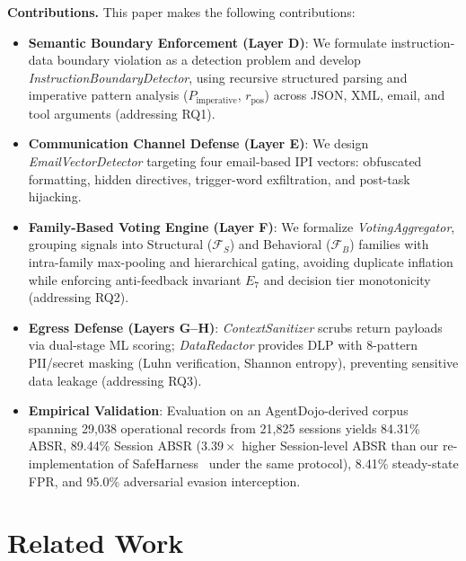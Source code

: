 \documentclass[runningheads]{llncs}
\begin{document}
\noindent\textbf{Contributions.} This paper makes the following contributions:
\begin{itemize}[leftmargin=*]
    \item \textbf{Semantic Boundary Enforcement (Layer D)}: We formulate instruction-data boundary violation as a detection problem and develop \textit{InstructionBoundaryDetector}, using recursive structured parsing and imperative pattern analysis ($P_{\text{imperative}}$, $r_{\text{pos}}$) across JSON, XML, email, and tool arguments (addressing RQ1).
    \item \textbf{Communication Channel Defense (Layer E)}: We design \textit{EmailVectorDetector} targeting four email-based IPI vectors: obfuscated formatting, hidden directives, trigger-word exfiltration, and post-task hijacking.
    \item \textbf{Family-Based Voting Engine (Layer F)}: We formalize \textit{VotingAggregator}, grouping signals into Structural ($\mathcal{F}_S$) and Behavioral ($\mathcal{F}_B$) families with intra-family max-pooling and hierarchical gating, avoiding duplicate inflation while enforcing anti-feedback invariant $E_7$ and decision tier monotonicity (addressing RQ2).
    \item \textbf{Egress Defense (Layers G--H)}: \textit{ContextSanitizer} scrubs return payloads via dual-stage ML scoring; \textit{DataRedactor} provides DLP with 8-pattern PII/secret masking (Luhn verification, Shannon entropy), preventing sensitive data leakage (addressing RQ3).
    \item \textbf{Empirical Validation}: Evaluation on an AgentDojo-derived corpus spanning 29,038 operational records from 21,825 sessions yields 84.31\% ABSR, 89.44\% Session ABSR ($3.39\times$ higher Session-level ABSR than our re-implementation of SafeHarness~\cite{liu2024safeharness} under the same protocol), 8.41\% steady-state FPR, and 95.0\% adversarial evasion interception.
\end{itemize}

\section{Related Work}
\label{sec:related}
\end{document}
